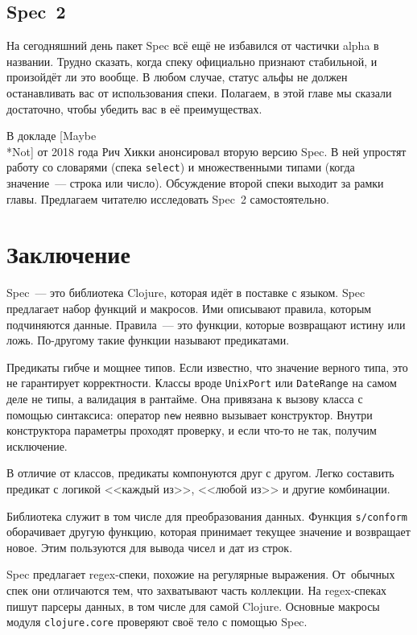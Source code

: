 \subsection{Spec~2}

На сегодняшний день пакет Spec всё ещё не избавился от частички alpha в
названии. Трудно сказать, когда спеку официально признают стабильной, и
произойдёт ли это вообще. В любом случае, статус альфы не должен останавливать
вас от использования спеки. Полагаем, в этой главе мы сказали достаточно, чтобы
убедить вас в её преимуществах.


В докладе [Maybe\\*Not]
от 2018 года Рич Хикки анонсировал вторую версию Spec. В ней упростят работу со
словарями (спека \verb|select|) и множественными типами (когда значение~---
строка или число). Обсуждение второй спеки выходит за рамки главы. Предлагаем
читателю исследовать Spec~2 самостоятельно.

\section{Заключение}

Spec~--- это библиотека Clojure, которая идёт в поставке с языком. Spec
предлагает набор функций и макросов. Ими описывают правила, которым подчиняются
данные. Правила~--- это функции, которые возвращают истину или ложь. По-другому
такие функции называют предикатами.

Предикаты гибче и мощнее типов. Если известно, что значение верного типа, это не
гарантирует корректности. Классы вроде \verb|UnixPort| или \verb|DateRange| на
самом деле не типы, а валидация в рантайме. Она привязана к вызову класса с
помощью синтаксиса: оператор \verb|new| неявно вызывает конструктор. Внутри
конструктора параметры проходят проверку, и если что-то не так, получим
исключение.

В отличие от классов, предикаты компонуются друг с другом. Легко составить
предикат с логикой <<каждый из>>, <<любой из>> и другие комбинации.

Библиотека служит в том числе для преобразования данных. Функция
\verb|s/conform| оборачивает другую функцию, которая принимает текущее значение
и возвращает новое. Этим пользуются для вывода чисел и дат из строк.

Spec предлагает regex-спеки, похожие на регулярные выражения. От~обычных спек
они отличаются тем, что захватывают часть коллекции. На regex-спеках пишут
парсеры данных, в том числе для самой Clojure. Основные макросы модуля
\verb|clojure.core| проверяют своё тело с помощью Spec.

